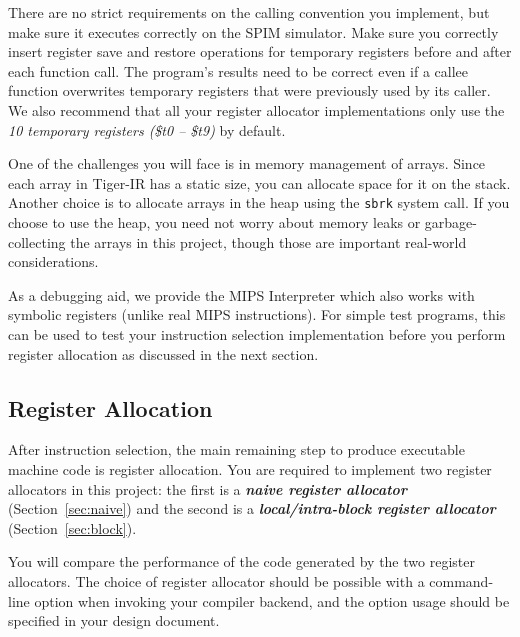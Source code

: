 \documentclass[12pt]{article}
\begin{document}
There are no strict requirements on the calling convention you implement, but make sure it executes correctly on the SPIM simulator. Make sure you correctly insert register save and restore operations for temporary registers before and after each function call. The program's results need to be correct even if a callee function overwrites temporary registers that were previously used by its caller. We also recommend that all your register allocator implementations only use the \textit{10 temporary registers (\$t0 -- \$t9)} by default.




One of the challenges you will face is in memory management of arrays. Since each array in Tiger-IR has a static size, you can allocate space for it on the stack. Another choice is to allocate arrays in the heap using the \texttt{sbrk} system call. If you choose to use the heap, you need not worry about memory leaks or garbage-collecting the arrays in this project, though those are important real-world considerations.

As a debugging aid, we provide the MIPS Interpreter which also works with symbolic registers (unlike real MIPS instructions). For simple test programs, this can be used to test your instruction selection implementation before you perform register allocation as discussed in the next section.

\subsection{Register Allocation}

After instruction selection, the main remaining step to produce executable machine code is register allocation. You are required to implement two register allocators in this project: the first is a \textit{\textbf{naive register allocator}} (Section~\ref{sec:naive}) and the second is a \textit{\textbf{local/intra-block register allocator}} (Section~\ref{sec:block}).


You will compare the performance of the code generated by the two register allocators. The choice of register allocator should be possible with a command-line option when invoking your compiler backend, and the option usage should be specified in your design document.
\end{document}

